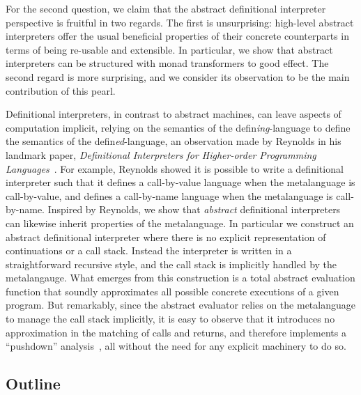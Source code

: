 For the second question, we claim that the abstract definitional
interpreter perspective is fruitful in two regards.  The first is
unsurprising: high-level abstract interpreters offer the usual
beneficial properties of their concrete counterparts in terms of being
re-usable and extensible.  In particular, we show that abstract
interpreters can be structured with monad transformers to good effect.
The second regard is more surprising, and we consider its observation
to be the main contribution of this pearl.

Definitional interpreters, in contrast to abstract machines, can leave
aspects of computation implicit, relying on the semantics of the
defin\emph{ing}-language to define the semantics of the
defin\emph{ed}-language, an observation made by Reynolds in his landmark
paper, \emph{Definitional Interpreters for Higher-order Programming
  Languages}~\cite{dvanhorn:reynolds-acm72}.  For example, Reynolds showed it is
possible to write a definitional interpreter such that it defines a
call-by-value language when the metalanguage is call-by-value, and
defines a call-by-name language when the metalanguage is call-by-name.
Inspired by Reynolds, we show that \emph{abstract} definitional interpreters can likewise
inherit properties of the metalanguage.  In particular we construct an
abstract definitional interpreter where there is no explicit
representation of continuations or a call stack.  Instead the
interpreter is written in a straightforward recursive style, and the
call stack is implicitly handled by the metalangauge.  What emerges
from this construction is a total abstract evaluation function that
soundly approximates all possible concrete executions of a given
program.  But remarkably, since the abstract evaluator relies on the
metalanguage to manage the call stack implicitly, it is easy to
observe that it introduces no approximation in the matching of calls
and returns, and therefore implements a ``pushdown''
analysis~\cite{dvanhorn:Earl2010Pushdown,
  dvanhorn:Vardoulakis2011CFA2}, all without the need for any explicit
machinery to do so.

\subsection*{Outline}

